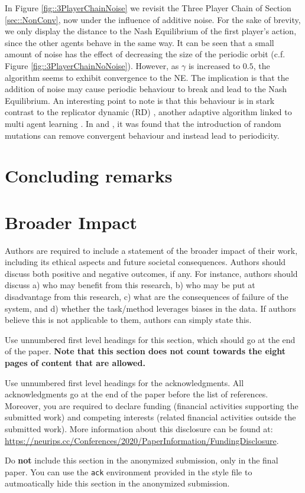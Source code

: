 \documentclass{article}
\theoremstyle{definition}
\begin{document}
  In Figure \ref{fig::3PlayerChainNoise} we revisit the Three Player Chain of Section
  \ref{sec::NonConv}, now under the influence of additive noise. For the sake of brevity, we only
  display the distance to the Nash Equilibrium of the first player's action, since the other agents
  behave in the same way. It can be seen that a small amount of noise has the effect of decreasing
  the size of the periodic orbit (c.f. Figure \ref{fig::3PlayerChainNoNoise}). However, as $\gamma$
  is increased to $0.5$, the algorithm seems to exhibit convergence to the NE. The implication is
  that the addition of noise may cause periodic behaviour to break and lead to the Nash Equilibrium.
  An interesting point to note is that this behaviour is in stark contrast to the replicator
  dynamic (RD) \cite{Maynard-Smith}, another adaptive algorithm linked to multi agent learning
  \cite{CyclesAdversarialLearning}. In \cite{Imhof} and \cite{Galla}, it was found that the
  introduction of random mutations can remove convergent behaviour and instead lead to periodicity. 
  
\section{Concluding remarks}


\section*{Broader Impact}

Authors are required to include a statement of the broader impact of their work, including its ethical aspects and future societal consequences. 
Authors should discuss both positive and negative outcomes, if any. For instance, authors should discuss a) 
who may benefit from this research, b) who may be put at disadvantage from this research, c) what are the consequences of failure of the system, and d) whether the task/method leverages
biases in the data. If authors believe this is not applicable to them, authors can simply state this.

Use unnumbered first level headings for this section, which should go at the end of the paper. {\bf Note that this section does not count towards the eight pages of content that are allowed.}

\begin{ack}
Use unnumbered first level headings for the acknowledgments. All acknowledgments
go at the end of the paper before the list of references. Moreover, you are required to declare 
funding (financial activities supporting the submitted work) and competing interests (related financial activities outside the submitted work). 
More information about this disclosure can be found at: \url{https://neurips.cc/Conferences/2020/PaperInformation/FundingDisclosure}.


Do {\bf not} include this section in the anonymized submission, only in the final paper. You can use the \texttt{ack} environment provided in the style file to autmoatically hide this section in the anonymized submission.
\end{ack}
\end{document}
